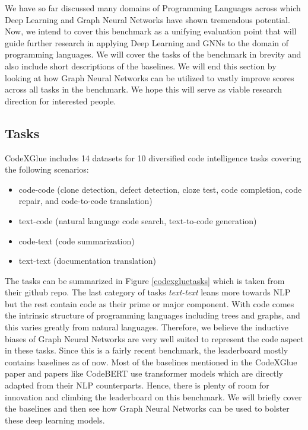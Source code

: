 \documentclass{article}
\begin{document}
We have so far discussed many domains of Programming Languages across which Deep Learning and Graph Neural Networks have shown tremendous potential. Now, we intend to cover this benchmark as a unifying evaluation point that will guide further research in applying Deep Learning and GNNs to the domain of programming languages. We will cover the tasks of the benchmark in brevity and also include short descriptions of the baselines. We will end this section by looking at how Graph Neural Networks can be utilized to vastly improve scores across all tasks in the benchmark. We hope this will serve as viable research direction for interested people.

\subsection{Tasks}
CodeXGlue includes 14 datasets for 10 diversified code intelligence tasks covering the following scenarios:
\begin{itemize}
    \item code-code (clone detection, defect detection, cloze test, code completion, code repair, and code-to-code translation)
    \item text-code (natural language code search, text-to-code generation)
    \item code-text (code summarization)
    \item text-text (documentation translation)
\end{itemize}

The tasks can be summarized in Figure \ref{codexgluetasks} which is taken from their github repo. The last category of tasks \textit{text-text} leans more towards NLP but the rest contain code as their prime or major component. With code comes the intrinsic structure of programming languages including trees and graphs, and this varies greatly from natural languages. Therefore, we believe the inductive biases of Graph Neural Networks are very well suited to represent the code aspect in these tasks. Since this is a fairly recent benchmark, the leaderboard mostly contains baselines as of now. Most of the baselines mentioned in the CodeXGlue paper and papers like CodeBERT \cite{feng2020codebert} use transformer models which are directly adapted from their NLP counterparts. Hence, there is plenty of room for innovation and climbing the leaderboard on this benchmark. We will briefly cover the baselines and then see how Graph Neural Networks can be used to bolster these deep learning models.
\end{document}
